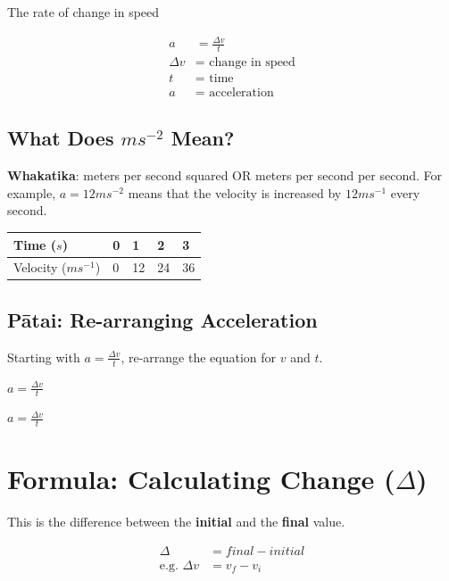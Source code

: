 \documentclass{report}
\newcommand{\choice}{\item}
\begin{document}
The rate of change in speed

\begin{align}
    a &= \frac{\Delta v}{t} \\
    \Delta v &= \text{ change in speed} \\
    t &= \text{ time} \\
    a &= \text{ acceleration}
\end{align}

\subsection{What Does $ms^{-2}$ Mean?}

\textbf{Whakatika}: meters per second squared OR meters per second per second. For example, $a=12ms^{-2}$ means that the velocity is increased by $12ms^{-1}$ every second.

\begin{table}[h]
\centering
\begin{tabular}{lllll}
\hline
Time ($s$)           & 0 & 1  & 2  & 3  \\ \hline
Velocity ($ms^{-1}$) & 0 & 12 & 24 & 36 \\ \hline
\end{tabular}
\end{table}

\subsection{Pātai: Re-arranging Acceleration}

Starting with $a = \frac{\Delta v}{t}$, re-arrange the equation for $v$ and $t$.

\begin{choices}[twocol]
   \choice $a = \frac{\Delta v}{t}$
   \choice $a = \frac{\Delta v}{t}$
\end{choices}

\vspace{3cm}

\section{Formula: Calculating Change ($\Delta$)}

This is the difference between the \textbf{initial} and the \textbf{final} value.

\begin{align}
    \Delta &= final - initial \\
    \text{e.g. }\Delta v &= v_{f} - v_{i}
\end{align}
\end{document}
